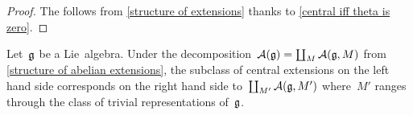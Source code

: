 \begin{proof}
	The  follows from \cref{structure of extensions} thanks to \cref{central iff theta is zero}.
\end{proof}


\begin{remark}
	Let~$\mathfrak{g}$ be a Lie~algebra.
	Under the decomposition~$\mathcal{A}(\mathfrak{g}) = \coprod_M \mathcal{A}(\mathfrak{g}, M)$ from \cref{structure of abelian extensions}, the subclass of central extensions on the left hand side corresponds on the right hand side to~$\coprod_{M'} \mathcal{A}(\mathfrak{g}, M')$ where~$M'$ ranges through the class of trivial representations of~$\mathfrak{g}$.
\end{remark}



